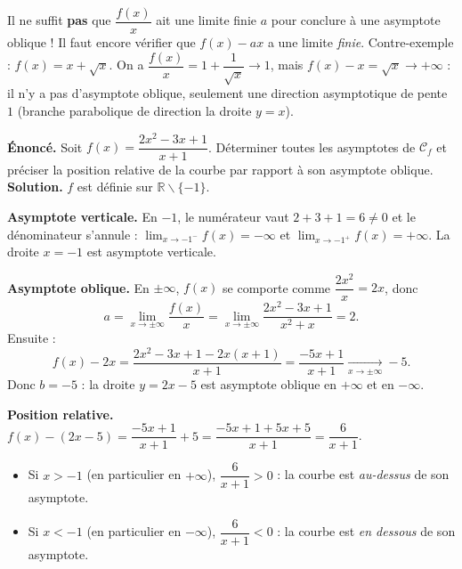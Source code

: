 \documentclass[11pt]{article}
\newcommand{\cle}[1]{{\popxbold\color{popdark}#1}}
\def\setminus{\mathbin{\backslash}}\let\smallsetminus\setminus
\begin{document}
\begin{attention}
Il ne suffit \textbf{pas} que $\dfrac{f(x)}{x}$ ait une limite finie $a$ pour conclure à une asymptote oblique ! Il faut encore vérifier que $f(x)-ax$ a une limite \emph{finie}. Contre-exemple : $f(x) = x + \sqrt{x}$. On a $\dfrac{f(x)}{x} = 1 + \dfrac{1}{\sqrt{x}} \to 1$, mais $f(x) - x = \sqrt{x} \to +\infty$ : il n'y a pas d'asymptote oblique, seulement une \cle{direction asymptotique} de pente $1$ (branche parabolique de direction la droite $y=x$).
\end{attention}

\begin{exoresolu}[Asymptotes de $f(x)=\dfrac{2x^2-3x+1}{x+1}$]
\textbf{Énoncé.} Soit $f(x)=\dfrac{2x^2-3x+1}{x+1}$. Déterminer toutes les asymptotes de $\mathcal{C}_f$ et préciser la position relative de la courbe par rapport à son asymptote oblique.
\tcblower
\textbf{Solution.} $f$ est définie sur $\mathbb{R}\setminus\{-1\}$.

\textbf{Asymptote verticale.} En $-1$, le numérateur vaut $2+3+1=6\neq 0$ et le dénominateur s'annule : $\lim_{x\to -1^-}f(x)=-\infty$ et $\lim_{x\to -1^+}f(x)=+\infty$. La droite $x=-1$ est asymptote verticale.

\textbf{Asymptote oblique.} En $\pm\infty$, $f(x)$ se comporte comme $\dfrac{2x^2}{x}=2x$, donc
\[
a=\lim_{x\to\pm\infty}\frac{f(x)}{x}=\lim_{x\to\pm\infty}\frac{2x^2-3x+1}{x^2+x}=2.
\]
Ensuite :
\[
f(x)-2x=\frac{2x^2-3x+1-2x(x+1)}{x+1}=\frac{-5x+1}{x+1}\xrightarrow[x\to\pm\infty]{}-5.
\]
Donc $b=-5$ : la droite $y=2x-5$ est asymptote oblique en $+\infty$ et en $-\infty$.

\textbf{Position relative.} $f(x)-(2x-5)=\dfrac{-5x+1}{x+1}+5=\dfrac{-5x+1+5x+5}{x+1}=\dfrac{6}{x+1}$.
\begin{itemize}
\item Si $x>-1$ (en particulier en $+\infty$), $\dfrac{6}{x+1}>0$ : la courbe est \emph{au-dessus} de son asymptote.
\item Si $x<-1$ (en particulier en $-\infty$), $\dfrac{6}{x+1}<0$ : la courbe est \emph{en dessous} de son asymptote.
\end{itemize}
\end{exoresolu}
\end{document}
